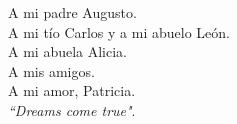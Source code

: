 \begin{center}
    \label{dedicatoria}
    A mi padre Augusto.\\
    A mi tío Carlos y a mi abuelo León.\\
    A mi abuela Alicia.\\
    A mis amigos.\\
    A mi amor, Patricia.\\
    \textit{``Dreams come true"}.
\end{center}
\pagebreak